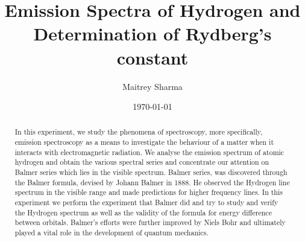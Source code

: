 \documentclass[%
 reprint,
 amsmath,amssymb,
 aps,
]{revtex4-2}
\begin{document}

\title{Emission Spectra of Hydrogen and\\ Determination of Rydberg's constant}%


\author{Maitrey Sharma}




\date{\today}%

\begin{abstract}
In this experiment, we study the phenomena of spectroscopy, more specifically, emission spectroscopy as a means to investigate the behaviour of a matter when it interacts with electromagnetic radiation. We analyse the emission spectrum of atomic hydrogen and obtain the various spectral series and concentrate our attention on Balmer series which lies in the visible spectrum. Balmer series, was discovered through the Balmer formula, devised by Johann Balmer in 1888. He observed the Hydrogen line spectrum in the visible range and made predictions for higher frequency lines. In this experiment we perform the experiment that Balmer did and try to study and verify the Hydrogen spectrum as well as the validity of the formula for energy difference between orbitals. Balmer's efforts were further improved by Niels Bohr and ultimately played a vital role in the development of quantum mechanics. 
\end{abstract}

\maketitle

\end{document}
